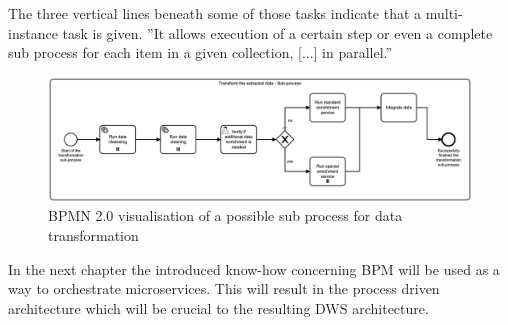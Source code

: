 The three vertical lines beneath some of those tasks indicate that a multi-instance task is given. ''It allows execution of a certain step or even a complete sub process for each item in a given collection, [...] in parallel.'' \cite{bpmMultiInstance} \newline
\begin{figure}[!htb]
    \centering
    \includegraphics[scale=0.13]{pictures/DataTransformationSubprocess.png}
    \caption{BPMN 2.0 visualisation of a possible sub process for data transformation}
    \label{fig:BPMNdatatransformation}
\end{figure}

In the next chapter the introduced know-how concerning BPM will be used as a way to orchestrate microservices. This will result in the process driven architecture which will be crucial to the resulting DWS architecture.

